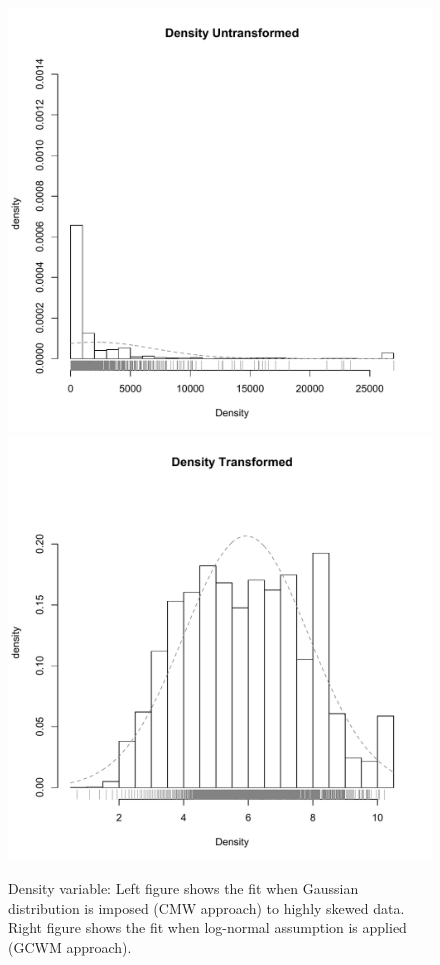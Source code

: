 \documentclass[11pt,letterpaper]{article}
\numberwithin{equation}{section}
\numberwithin{equation}{section}
\numberwithin{equation}{section}
\begin{document}
\begin{figure}[!htb]
\begin{center}
\caption{Density variable: Left figure shows the fit when Gaussian distribution is imposed (CMW approach) to highly skewed data. Right figure shows the fit when log-normal assumption is applied (GCWM approach).}
\includegraphics[scale=0.40]{Density.pdf}
\includegraphics[scale=0.40]{logDensity.pdf}
\end{center}

\label{fig:vet1}
\end{figure}
\end{document}
